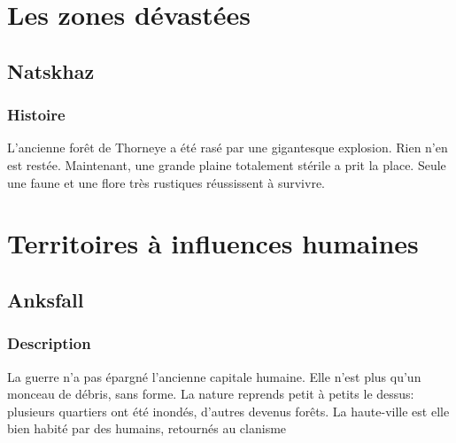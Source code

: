 \section{Les zones dévastées}
\subsection{Natskhaz}
\subsubsection{Histoire}
\hypertarget{natskhaz}{}L'ancienne forêt de Thorneye a été rasé par une gigantesque explosion.
Rien n'en est restée.
Maintenant, une grande plaine totalement stérile a prit la place.
Seule une faune et une flore très rustiques réussissent à survivre.

\section{Territoires à influences humaines}
\subsection{Anksfall}
\subsubsection{Description}
La guerre n'a pas épargné l'ancienne capitale humaine. Elle n'est plus qu'un monceau de débris, sans forme. La nature reprends petit à petits le dessus: plusieurs quartiers ont été inondés, d'autres devenus forêts.
\newline
La haute-ville est elle bien habité par des humains, retournés au clanisme
